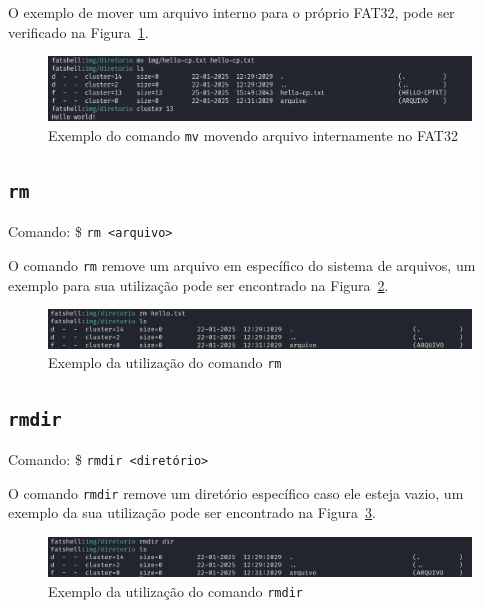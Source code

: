 \documentclass[
    12pt,				%
    oneside,   	        %
    a4paper,			%
    english,			%
    french,				%
    spanish,			%
    brazil,				%
    ]{pacotes/abntex2}
\begin{document}
O exemplo de mover um arquivo interno para o próprio FAT32, pode ser verificado na Figura~\ref{fig:mv-interno}.

\begin{figure}[H]
    \centering
    \includegraphics[width=450pt]{figuras/resultados/18-mv-interno-interno.PNG}
    \caption{Exemplo do comando \texttt{mv} movendo arquivo internamente no FAT32}
    \label{fig:mv-interno}
\end{figure}


\subsection{\texttt{rm}}
\label{subsec:rm}
Comando: \$ \texttt{rm <arquivo>}

O comando \texttt{rm} remove um arquivo em específico do sistema de arquivos, um exemplo para sua utilização pode ser encontrado na Figura~\ref{fig:rm}.

\begin{figure}[H]
    \centering
    \includegraphics[width=450pt]{figuras/resultados/16-rm.PNG}
    \caption{Exemplo da utilização do comando \texttt{rm}}
    \label{fig:rm}
\end{figure}


\subsection{\texttt{rmdir}}
\label{subsec:rmdir}
Comando: \$ \texttt{rmdir <diretório>}

O comando \texttt{rmdir} remove um diretório específico caso ele esteja vazio, um exemplo da sua utilização pode ser encontrado na Figura~\ref{fig:rmdir}.

\begin{figure}[H]
    \centering
    \includegraphics[width=450pt]{figuras/resultados/17-rmdir.PNG}
    \caption{Exemplo da utilização do comando \texttt{rmdir}}
    \label{fig:rmdir}
\end{figure}
\end{document}
